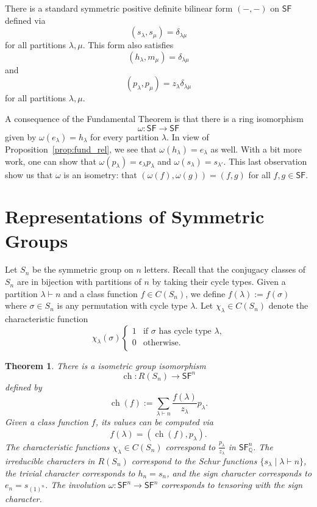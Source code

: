 \documentclass[12pt]{article}
\theoremstyle{plain}
\newtheorem{theorem}{Theorem}[section]
\theoremstyle{definition}
\theoremstyle{remark}
\numberwithin{equation}{section}
\begin{document}
There is a standard symmetric positive definite bilinear form $(-,-)$
on $\mathsf{SF}$ defined via
\[
( s_\lambda, s_\mu ) = \delta_{\lambda \mu}
\]
for all partitions $\lambda, \mu$.
This form also satisfies
\[
( h_\lambda, m_\mu ) = \delta_{\lambda \mu}
\]
and
\[
( p_\lambda, p_\mu ) = z_\lambda \delta_{\lambda \mu}
\]
for all partitions $\lambda, \mu$.

A consequence of the Fundamental Theorem is that there is a ring
isomorphism
\[
\omega : \mathsf{SF} \to \mathsf{SF}
\]
given by $\omega(e_\lambda)=h_\lambda$ for every partition $\lambda$.
In view of Proposition~\ref{prop:fund_rel}, we see that
$\omega(h_\lambda)=e_\lambda$ as well.
With a bit more work, one can show that
$\omega(p_\lambda)=\epsilon_\lambda p_\lambda$
and
$\omega(s_\lambda)=s_{\lambda'}$.
This last observation show us that $\omega$ is an isometry:
that $( \omega(f), \omega(g) ) = (f, g)$ for
all $f,g \in \mathsf{SF}$.

\section{Representations of Symmetric Groups}

Let $S_n$ be the symmetric group on $n$ letters.
Recall that the conjugacy classes of $S_n$ are in bijection with
partitions of $n$ by taking their cycle types.
Given a partition $\lambda \vdash n$ and a class function
$f \in C(S_n)$, we define $f(\lambda):=f(\sigma)$ where
$\sigma \in S_n$ is any permutation with cycle type $\lambda$.
Let $\chi_\lambda \in C(S_n)$ denote the characteristic function
\[
\chi_\lambda(\sigma)
\begin{cases}
1 & \textrm{if $\sigma$ has cycle type $\lambda$,}\\
0 & \textrm{otherwise.}\\
\end{cases}
\]

\begin{theorem}
There is a isometric group isomorphism
\[
\operatorname{ch} : R(S_n) \to \mathsf{SF}^n
\]
defined by
\[
\operatorname{ch}(f) :=
\sum_{\lambda \vdash n} \frac{f(\lambda)}{z_\lambda} p_{\lambda}.
\]
Given a class function $f$, its values can be computed via
\[
f(\lambda) = ( \operatorname{ch}(f), p_\lambda ).
\]
The characteristic functions $\chi_\lambda \in C(S_n)$
correspond to $\frac{p_{\lambda}}{z_\lambda}$ in
$\mathsf{SF}^n_{\mathbb{Q}}$.
The irreducible characters in $R(S_n)$ correspond to the Schur
functions $\{ s_\lambda \mid \lambda \vdash n \}$,
the trivial character corresponds to $h_n=s_n$, and
the sign character corresponds to $e_n=s_{(1)^n}$.
The involution $\omega : \mathsf{SF}^n \to \mathsf{SF}^n$
corresponds to tensoring with the sign character.
\end{theorem}
\end{document}
